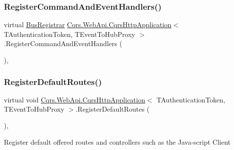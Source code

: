 \subsubsection{\texorpdfstring{Register\+Command\+And\+Event\+Handlers()}{RegisterCommandAndEventHandlers()}}
{\footnotesize\ttfamily virtual \hyperlink{classCqrs_1_1Configuration_1_1BusRegistrar}{Bus\+Registrar} \hyperlink{classCqrs_1_1WebApi_1_1CqrsHttpApplication}{Cqrs.\+Web\+Api.\+Cqrs\+Http\+Application}$<$ T\+Authentication\+Token, T\+Event\+To\+Hub\+Proxy $>$.Register\+Command\+And\+Event\+Handlers (\begin{DoxyParamCaption}{ }\end{DoxyParamCaption})\hspace{0.3cm}{\ttfamily [protected]}, {\ttfamily [virtual]}}

\mbox{\label{classCqrs_1_1WebApi_1_1CqrsHttpApplication_afaeb2e7a6c5e3e65ef1ff23ae6224070}} 
\subsubsection{\texorpdfstring{Register\+Default\+Routes()}{RegisterDefaultRoutes()}}
{\footnotesize\ttfamily virtual void \hyperlink{classCqrs_1_1WebApi_1_1CqrsHttpApplication}{Cqrs.\+Web\+Api.\+Cqrs\+Http\+Application}$<$ T\+Authentication\+Token, T\+Event\+To\+Hub\+Proxy $>$.Register\+Default\+Routes (\begin{DoxyParamCaption}{ }\end{DoxyParamCaption})\hspace{0.3cm}{\ttfamily [protected]}, {\ttfamily [virtual]}}



Register default offered routes and controllers such as the Java-\/script Client 

\mbox{\label{classCqrs_1_1WebApi_1_1CqrsHttpApplication_ad47fbc81b57345f9998345a2e270da5c}} 
